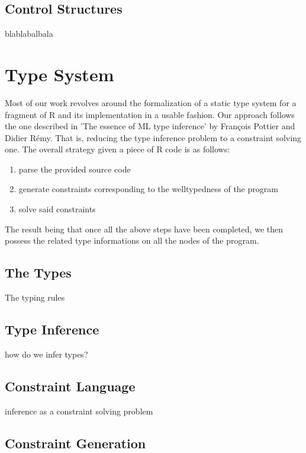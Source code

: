 \subsection{Control Structures}

blablabalbala





\section{Type System}

Most of our work revolves around the formalization of a static type system for a fragment of R and its implementation in a usable fashion. Our approach follows the one described in 'The essence of ML type inference' by Fran\c cois Pottier and Didier R\'emy. That is, reducing the type inference problem to a constraint solving one. The overall strategy given a piece of R code is as follows:
\begin{enumerate}
\item[] parse the provided source code
\item[] generate constraints corresponding to the welltypedness of the program
\item[] solve said constraints
\end{enumerate}

The result being that once all the above steps have been completed, we then possess the related type informations on all the nodes of the program.

\subsection{The Types}

The typing rules

\subsection{Type Inference}

how do we infer types?

\subsection{Constraint Language}

inference as a constraint solving problem

\subsection{Constraint Generation}

